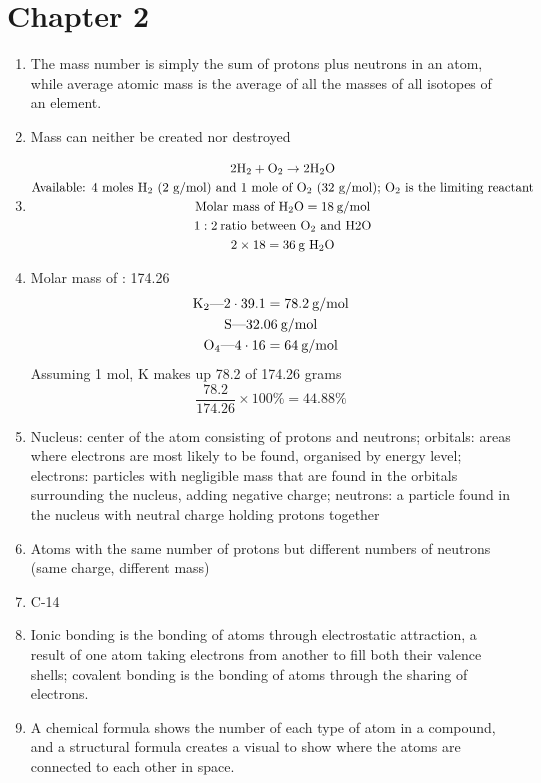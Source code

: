 \documentclass[a4paper, 12pt]{article}
\newcommand{\lab}[1]{\: \text{#1}}
\begin{document}
\section{Chapter 2}

\begin{enumerate}[label=\alph*.]
\item The mass number is simply the sum of protons plus neutrons in an atom, while average atomic mass is the average of all the masses of all isotopes of an element.  
\item Mass can neither be created nor destroyed
\item
\begin{gather*}
2\ce{H2} + \ce{O2} \to 2\ce{H2O} \\
\text{Available: 4 moles \ce{H2} (2 g/mol) and 1 mole of \ce{O2} (32 g/mol); \ce{O2} is the limiting reactant} \\
\text{Molar mass of \ce{H2O}} = 18 \lab{g/mol} \\
1:2 \: \text{ratio between \ce{O2} and {H2O}} \\
2 \times 18 = 36 \lab{g \ce{H2O}}
\end{gather*}
\item Molar mass of : 174.26 \lab{g/mol}
\begin{gather*}
\ce{K2}\text{---}2 \cdot 39.1 = 78.2 \lab{g/mol} \\
\ce{S}\text{---}32.06 \lab{g/mol} \\
\ce{O4}\text{---}4 \cdot 16 = 64 \lab{g/mol}
\end{gather*}
Assuming 1 mol, K makes up 78.2 of 174.26 grams
\[\frac{78.2}{174.26} \times 100\% = \boxed{44.88 \%}\]
\item Nucleus: center of the atom consisting of protons and neutrons; orbitals: areas where electrons are most likely to be found, organised by energy level; electrons: particles with negligible mass that are found in the orbitals surrounding the nucleus, adding negative charge; neutrons: a particle found in the nucleus with neutral charge holding protons together
\item Atoms with the same number of protons but different numbers of neutrons (same charge, different mass)
\item C-14
\item Ionic bonding is the bonding of atoms through electrostatic attraction, a result of one atom taking electrons from another to fill both their valence shells; covalent bonding is the bonding of atoms through the sharing of electrons.
\item A chemical formula shows the number of each type of atom in a compound, and a structural formula creates a visual to show where the atoms are connected to each other in space.

\end{enumerate}
\end{document}
